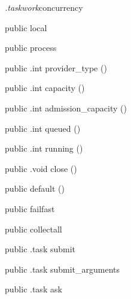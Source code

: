 \begin{CrexxClass}{\textit{.taskwork}}{concurrency}

  \begin{Hierarchy}
  \end{Hierarchy}

  \begin{Members}

    \Factory
      {public}
      {local}
      {}

    \Factory
      {public}
      {process}
      {}

    \Method
      {public}
      {.int}
      {provider\_type}
      {()}

    \Method
      {public}
      {.int}
      {capacity}
      {()}

    \Method
      {public}
      {.int}
      {admission\_capacity}
      {()}

    \Method
      {public}
      {.int}
      {queued}
      {()}

    \Method
      {public}
      {.int}
      {running}
      {()}

    \Method
      {public}
      {.void}
      {close}
      {()}

    \Factory
      {public}
      {default}
      {()}

    \Factory
      {public}
      {failfast}
      {}

    \Factory
      {public}
      {collectall}
      {}

    \Method
      {public}
      {.task}
      {submit}
      {}

    \Method
      {public}
      {.task}
      {submit\_arguments}
      {}

    \Method
      {public}
      {.task}
      {ask}
      {}


\end{Members}
\end{CrexxClass}
